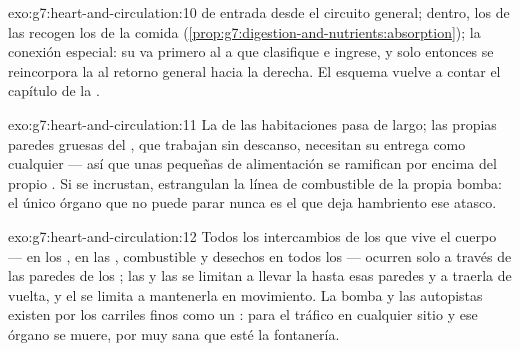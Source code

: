 \begin{solution}{exo:g7:heart-and-circulation:10}
 de entrada desde el circuito general; dentro, los  de
las  recogen los  de la comida
(\cref{prop:g7:digestion-and-nutrients:absorption}); la conexión
especial: su  va primero al  a que clasifique e ingrese, y
solo entonces se reincorpora la  al retorno general hacia la
 derecha. El esquema vuelve a contar el capítulo de la
.
\end{solution}

\begin{solution}{exo:g7:heart-and-circulation:11}
La  de las habitaciones pasa de largo; las propias paredes
gruesas del , que trabajan sin descanso, necesitan su entrega
 como cualquier  --- así que unas  pequeñas de
alimentación se ramifican por encima del propio . Si se
incrustan, estrangulan la línea de combustible de la propia bomba: el
único órgano que no puede parar nunca es el que deja hambriento ese
atasco.
\end{solution}

\begin{solution}{exo:g7:heart-and-circulation:12}
Todos los intercambios de los que vive el cuerpo ---  en los
,  en las , combustible y desechos en
todos los  --- ocurren solo a través de las paredes de los
; las  y las  se limitan a llevar la  hasta
esas paredes y a traerla de vuelta, y el  se limita a mantenerla
en movimiento. La bomba y las autopistas existen por los carriles finos
como un : para el tráfico  en cualquier sitio y ese órgano
se muere, por muy sana que esté la fontanería.
\end{solution}

